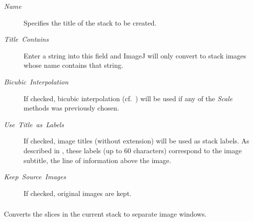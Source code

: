 \begin{description}
\item [{\emph{Name}}] Specifies the title of the stack to be created.
\item [{\emph{Title\ Contains}}] Enter a string into this field and ImageJ
will only convert to stack images whose name contains that string.
\item [{\emph{Bicubic\ Interpolation}}] If checked, bicubic interpolation
(cf.\ ) will
be used if any of the \emph{Scale} methods was previously chosen.
\item [{\emph{Use\ Title\ as\ Labels}}] If checked, image titles (without
extension) will be used as stack labels. As described in ,
these labels (up to 60 characters) correspond to the image subtitle,
the line of information above the image.
\item [{\emph{Keep\ Source\ Images}}] If checked, original images are
kept.
\end{description}

\subsubsection{\protect{}\label{sub:Stack-To-Images}}

Converts the slices in the current stack to separate image windows.




\subsubsection[\protect\userinterface{Make Montage\ldots{}}]{\protect{}\label{sub:Make-Montage}\improvement{}}

